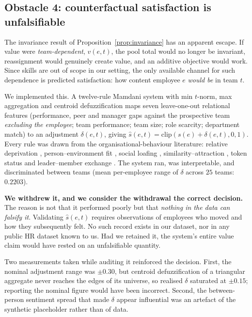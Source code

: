 \documentclass[conference]{IEEEtran}
\newcommand{\vv}{v}
\begin{document}
\subsection{Obstacle 4: counterfactual satisfaction is unfalsifiable}
\label{sec:obstacle4}

The invariance result of Proposition~\ref{prop:invariance} has an apparent escape.
If value were \emph{team-dependent}, $\vv(e,t)$, the pool total would no longer be
invariant, reassignment would genuinely create value, and an additive objective
would work. Since skills are out of scope in our setting, the only available
channel for such dependence is predicted satisfaction: how content employee $e$
\emph{would be} in team $t$.

We implemented this. A twelve-rule Mamdani system \cite{mamdani1975,zadeh1965}
with min $t$-norm, max aggregation and centroid defuzzification maps seven
leave-one-out relational features (performance, peer and manager gaps against the
prospective team \emph{excluding the employee}; team performance; team size; role
scarcity; department match) to an adjustment $\delta(e,t)$, giving
$\hat{s}(e,t)=\mathrm{clip}(s(e)+\delta(e,t),0,1)$. Every rule was drawn from the
organisational-behaviour literature: relative deprivation \cite{crosby1976},
person--environment fit \cite{kristof2005}, social loafing \cite{karau1993},
similarity--attraction \cite{byrne1971}, token status \cite{kanter1977} and
leader--member exchange \cite{graen1995}. The system ran, was interpretable, and
discriminated between teams (mean per-employee range of $\delta$ across $25$
teams: $0.2203$).

\textbf{We withdrew it, and we consider the withdrawal the correct decision.} The
reason is not that it performed poorly but that \emph{nothing in the data can
falsify it}. Validating $\hat{s}(e,t)$ requires observations of employees who
moved and how they subsequently felt. No such record exists in our dataset, nor
in any public HR dataset known to us. Had we retained it, the system's entire
value claim would have rested on an unfalsifiable quantity.

Two measurements taken while auditing it reinforced the decision. First, the
nominal adjustment range was $\pm 0.30$, but centroid defuzzification of a
triangular aggregate never reaches the edges of its universe, so realised
$\delta$ saturated at $\pm 0.15$; reporting the nominal figure would have been
incorrect. Second, the between-person sentiment spread that made $\delta$ appear
influential was an artefact of the synthetic placeholder rather than of data.
\end{document}
